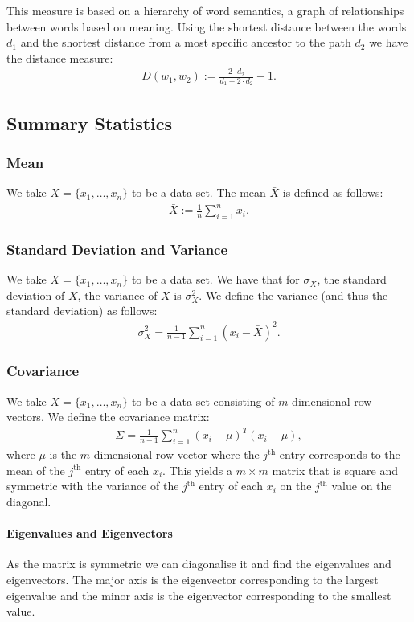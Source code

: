 This measure is based on a hierarchy of word semantics, a
graph of relationships between words based on meaning.
Using the shortest distance between the words $d_1$ and the 
shortest distance from a most specific ancestor to the path
$d_2$ we have the distance measure: \begin{gather*}
    D(w_1, w_2) := \frac{2 \cdot d_2}{d_1 + 2 \cdot d_2} - 1.
\end{gather*}

\subsection{Summary Statistics}

\subsubsection{Mean}

We take $X = \{x_1, \ldots, x_n\}$ to be a data set.
The mean $\bar{X}$ is defined as follows: \begin{gather*}
    \bar{X} := \frac{1}{n}\sum_{i = 1}^n x_i.
\end{gather*}

\subsubsection{Standard Deviation and Variance}

We take $X = \{x_1, \ldots, x_n\}$ to be a data set.
We have that for $\sigma_X$, the standard deviation of $X$,
the variance of $X$ is $\sigma_X^2$. We define the variance
(and thus the standard deviation) as follows: \begin{gather*}
    \sigma_X^2 = \frac{1}{n - 1}\sum_{i = 1}^n(x_i - \bar{X})^2.
\end{gather*} 

\subsubsection{Covariance}

We take $X = \{x_1, \ldots, x_n\}$ to be a data set consisting
of $m$-dimensional row vectors. We define the covariance matrix: 
\begin{gather*}
    \Sigma = \frac{1}{n - 1}\sum_{i = 1}^n (x_i - \mu)^T(x_i - \mu),
\end{gather*} where $\mu$ is the $m$-dimensional row vector
where the $j^{\text{th}}$ entry corresponds to the mean of the
$j^{\text{th}}$ entry of each $x_i$. This yields a $m \times m$
matrix that is square and symmetric with the variance of the
$j^{\text{th}}$ entry of each $x_i$ on the $j^{\text{th}}$ value
on the diagonal.

\paragraph{Eigenvalues and Eigenvectors} As the matrix is symmetric
we can diagonalise it and find the eigenvalues and eigenvectors.
The major axis is the eigenvector corresponding to the largest
eigenvalue and the minor axis is the eigenvector corresponding
to the smallest value.
